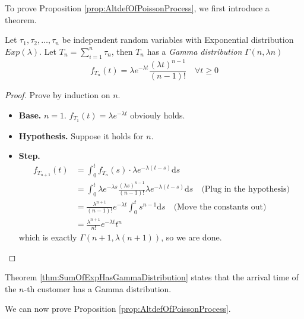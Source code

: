     To prove Proposition \ref{prop:AltdefOfPoissonProcess}, we first introduce a theorem.

    \begin{theorem}\label{thm:SumOfExpHasGammaDistribution}
        Let $\tau_1, \tau_2, \dots, \tau_n$ be independent random variables with Exponential distribution $Exp(\lambda)$. Let $T_n = \sum_{i=1}^n\tau_n$, then $T_n$ has a \emph{Gamma distribution} $\Gamma(n, \lambda n)$
        \[ f_{T_n}(t) = \lambda e^{-\lambda t}\frac{(\lambda t)^{n-1}}{(n-1)!} \quad \forall t \ge 0 \]
    \end{theorem}
    \begin{proof}
        Prove by induction on $n$.
        \begin{itemize}
            \item \textbf{Base. } $n=1$. $f_{T_1}(t) = \lambda e^{-\lambda t}$ obviouly holds.
            \item \textbf{Hypothesis. } Suppose it holds for $n$.
            \item \textbf{Step. }
            \begin{align*}
                f_{T_{n+1}}(t) &= \int_0^t f_{T_n}(s)\cdot\lambda e^{-\lambda(t-s)}\mathrm{d}s\\
                &= \int_0^t \lambda e^{-\lambda s}\frac{(\lambda s)^{n-1}}{(n-1)!}\lambda e^{-\lambda(t-s)}\mathrm{d}s \quad \text{(Plug in the hypothesis)}\\
                &= \frac{\lambda^{n+1}}{(n-1)!}e^{-\lambda t}\int_0^t s^{n-1}\mathrm{d}s \quad \text{(Move the constants out)}\\
                &= \frac{\lambda^{n+1}}{n!}e^{-\lambda t}t^n
            \end{align*}
            which is exactly $\Gamma(n+1, \lambda(n+1))$, so we are done.
        \end{itemize}
    \end{proof}
    \begin{remark}
        Theorem \ref{thm:SumOfExpHasGammaDistribution} states that the arrival time of the $n$-th customer has a Gamma distribution.
    \end{remark}

    We can now prove Proposition \ref{prop:AltdefOfPoissonProcess}.
